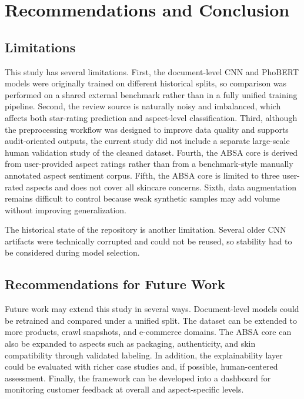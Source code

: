 \documentclass[a4paper,12pt]{extarticle}
\begin{document}
\section{Recommendations and Conclusion}

\subsection{Limitations}


This study has several limitations. First, the document-level CNN and PhoBERT models were originally trained on different historical splits, so comparison was performed on a shared external benchmark rather than in a fully unified training pipeline. Second, the review source is naturally noisy and imbalanced, which affects both star-rating prediction and aspect-level classification. Third, although the preprocessing workflow was designed to improve data quality and supports audit-oriented outputs, the current study did not include a separate large-scale human validation study of the cleaned dataset. Fourth, the ABSA core is derived from user-provided aspect ratings rather than from a benchmark-style manually annotated aspect sentiment corpus. Fifth, the ABSA core is limited to three user-rated aspects and does not cover all skincare concerns. Sixth, data augmentation remains difficult to control because weak synthetic samples may add volume without improving generalization.

The historical state of the repository is another limitation. Several older CNN artifacts were technically corrupted and could not be reused, so stability had to be considered during model selection.


\subsection{Recommendations for Future Work}


Future work may extend this study in several ways. Document-level models could be retrained and compared under a unified split. The dataset can be extended to more products, crawl snapshots, and e-commerce domains. The ABSA core can also be expanded to aspects such as packaging, authenticity, and skin compatibility through validated labeling. In addition, the explainability layer could be evaluated with richer case studies and, if possible, human-centered assessment. Finally, the framework can be developed into a dashboard for monitoring customer feedback at overall and aspect-specific levels.
\end{document}
